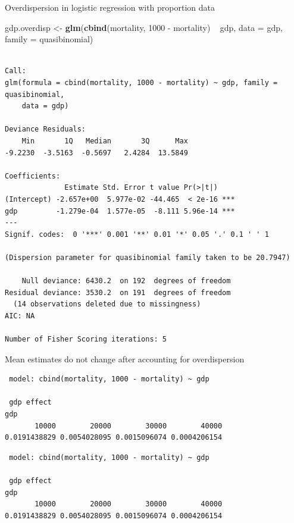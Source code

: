 \documentclass[10pt,ignorenonframetext,]{beamer}
\newenvironment{Shaded}{\begin{snugshade}}{\end{snugshade}}
\newcommand{\KeywordTok}[1]{\textcolor[rgb]{0.13,0.29,0.53}{\textbf{{#1}}}}
\newcommand{\DataTypeTok}[1]{\textcolor[rgb]{0.13,0.29,0.53}{{#1}}}
\newcommand{\DecValTok}[1]{\textcolor[rgb]{0.00,0.00,0.81}{{#1}}}
\newcommand{\StringTok}[1]{\textcolor[rgb]{0.31,0.60,0.02}{{#1}}}
\newcommand{\NormalTok}[1]{{#1}}
\begin{document}
\begin{frame}[fragile]{Overdispersion in logistic regression with
proportion data}

\begin{Shaded}
\begin{Highlighting}[]
\NormalTok{gdp.overdisp <-}\StringTok{ }\KeywordTok{glm}\NormalTok{(}\KeywordTok{cbind}\NormalTok{(mortality, }\DecValTok{1000} \NormalTok{-}\StringTok{ }\NormalTok{mortality) ~}\StringTok{ }\NormalTok{gdp, }
               \DataTypeTok{data =} \NormalTok{gdp, }\DataTypeTok{family =} \NormalTok{quasibinomial)}
\end{Highlighting}
\end{Shaded}

\begin{verbatim}

Call:
glm(formula = cbind(mortality, 1000 - mortality) ~ gdp, family = quasibinomial, 
    data = gdp)

Deviance Residuals: 
    Min       1Q   Median       3Q      Max  
-9.2230  -3.5163  -0.5697   2.4284  13.5849  

Coefficients:
              Estimate Std. Error t value Pr(>|t|)    
(Intercept) -2.657e+00  5.977e-02 -44.465  < 2e-16 ***
gdp         -1.279e-04  1.577e-05  -8.111 5.96e-14 ***
---
Signif. codes:  0 '***' 0.001 '**' 0.01 '*' 0.05 '.' 0.1 ' ' 1

(Dispersion parameter for quasibinomial family taken to be 20.7947)

    Null deviance: 6430.2  on 192  degrees of freedom
Residual deviance: 3530.2  on 191  degrees of freedom
  (14 observations deleted due to missingness)
AIC: NA

Number of Fisher Scoring iterations: 5
\end{verbatim}

\end{frame}

\begin{frame}[fragile]{Mean estimates do not change after accounting for
overdispersion}

\begin{verbatim}
 model: cbind(mortality, 1000 - mortality) ~ gdp

 gdp effect
gdp
       10000        20000        30000        40000 
0.0191438829 0.0054028095 0.0015096074 0.0004206154 
\end{verbatim}

\begin{verbatim}
 model: cbind(mortality, 1000 - mortality) ~ gdp

 gdp effect
gdp
       10000        20000        30000        40000 
0.0191438829 0.0054028095 0.0015096074 0.0004206154 
\end{verbatim}

\end{frame}
\end{document}
